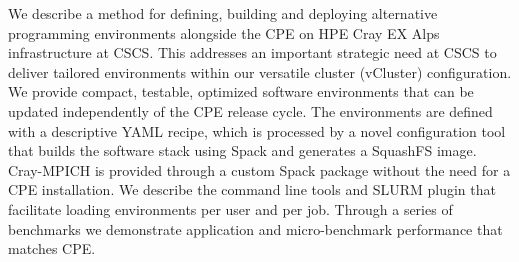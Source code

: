 We describe a method for defining, building and deploying alternative programming environments alongside the CPE on HPE Cray EX Alps infrastructure at CSCS.
This addresses an important strategic need at CSCS to deliver tailored environments within our versatile cluster (vCluster) configuration.
We provide compact, testable, optimized software environments that can be updated independently of the CPE release cycle.
The environments are defined with a descriptive YAML recipe, which is processed by a novel configuration tool that builds the software stack using Spack and generates a SquashFS image.
Cray-MPICH is provided through a custom Spack package without the need for a CPE installation.
We describe the command line tools and SLURM plugin that facilitate loading environments per user and per job.
Through a series of benchmarks we demonstrate application and micro-benchmark performance that matches CPE.

